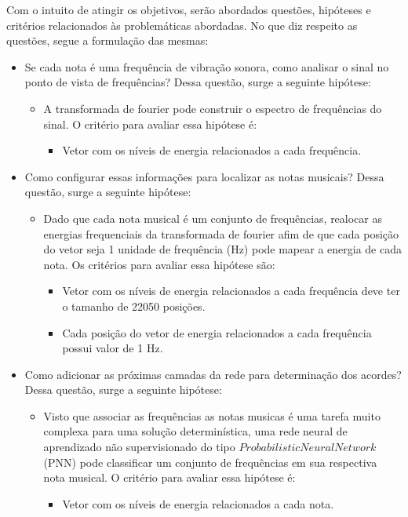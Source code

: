 Com o intuito de atingir os objetivos, serão abordados questões, hipóteses e critérios relacionados às problemáticas abordadas. No que diz respeito as questões, segue a formulação das mesmas:
\begin{itemize}
	\item Se cada nota é uma frequência de vibração sonora, como analisar o sinal no ponto de vista de frequências? Dessa questão, surge a seguinte hipótese:
	\begin{itemize}
		\item A transformada de fourier pode construir o espectro de frequências do sinal. O critério para avaliar essa hipótese é:
			\begin{itemize}
				\item Vetor com os níveis de energia relacionados a cada frequência.		
			\end{itemize}
	\end{itemize}

	\item Como configurar essas informações para localizar as notas musicais? Dessa questão, surge a seguinte hipótese:
	\begin{itemize}
		\item Dado que cada nota musical é um conjunto de frequências, realocar as energias frequenciais da transformada de fourier afim de que cada posição do vetor seja 1 unidade de frequência (Hz) pode mapear a energia de cada nota. Os critérios para avaliar essa hipótese são:
			\begin{itemize}
				\item Vetor com os níveis de energia relacionados a cada frequência deve ter o tamanho de 22050 posições.
				\item Cada posição do vetor de energia relacionados a cada frequência possui valor de 1 Hz.		
			\end{itemize}
	\end{itemize}

	\item Como adicionar as próximas camadas da rede para determinação dos acordes? Dessa questão, surge a seguinte hipótese:
	\begin{itemize}
		\item  Visto que associar as frequências as notas musicas é uma tarefa muito complexa para uma solução determinística, uma rede neural de aprendizado não supervisionado do tipo $Probabilistic Neural Network$ (PNN) pode classificar um conjunto de frequências em sua respectiva nota musical. O critério para avaliar essa hipótese é:
			\begin{itemize}
				\item Vetor com os níveis de energia relacionados a cada nota.		
			\end{itemize}
	\end{itemize}
	

\end{itemize}
